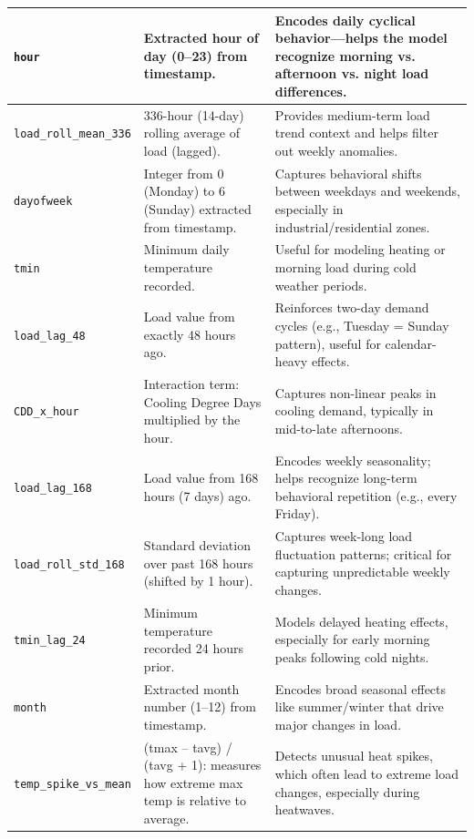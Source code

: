 \documentclass[final,numbered]{ifacconf}
\begin{document}
\begin{table}[p]
\begin{adjustbox}{width=\textwidth}
\begin{tabular}{|p{4cm}|p{6cm}|p{6cm}|}
\texttt{hour} & Extracted hour of day (0–23) from timestamp. & Encodes daily cyclical behavior—helps the model recognize morning vs. afternoon vs. night load differences. \\
\hline
\texttt{load\_roll\_mean\_336} & 336-hour (14-day) rolling average of load (lagged). & Provides medium-term load trend context and helps filter out weekly anomalies. \\
\hline
\texttt{dayofweek} & Integer from 0 (Monday) to 6 (Sunday) extracted from timestamp. & Captures behavioral shifts between weekdays and weekends, especially in industrial/residential zones. \\
\hline
\texttt{tmin} & Minimum daily temperature recorded. & Useful for modeling heating or morning load during cold weather periods. \\
\hline
\texttt{load\_lag\_48} & Load value from exactly 48 hours ago. & Reinforces two-day demand cycles (e.g., Tuesday = Sunday pattern), useful for calendar-heavy effects. \\
\hline
\texttt{CDD\_x\_hour} & Interaction term: Cooling Degree Days multiplied by the hour. & Captures non-linear peaks in cooling demand, typically in mid-to-late afternoons. \\
\hline
\texttt{load\_lag\_168} & Load value from 168 hours (7 days) ago. & Encodes weekly seasonality; helps recognize long-term behavioral repetition (e.g., every Friday). \\
\hline
\texttt{load\_roll\_std\_168} & Standard deviation over past 168 hours (shifted by 1 hour). & Captures week-long load fluctuation patterns; critical for capturing unpredictable weekly changes. \\
\hline
\texttt{tmin\_lag\_24} & Minimum temperature recorded 24 hours prior. & Models delayed heating effects, especially for early morning peaks following cold nights. \\
\hline
\texttt{month} & Extracted month number (1–12) from timestamp. & Encodes broad seasonal effects like summer/winter that drive major changes in load. \\
\hline
\texttt{temp\_spike\_vs\_mean} & (tmax – tavg) / (tavg + 1): measures how extreme max temp is relative to average. & Detects unusual heat spikes, which often lead to extreme load changes, especially during heatwaves. \\
\hline
\end{tabular}
\end{adjustbox}
\label{tab:shap_features}
\end{table}
\clearpage
\end{document}
